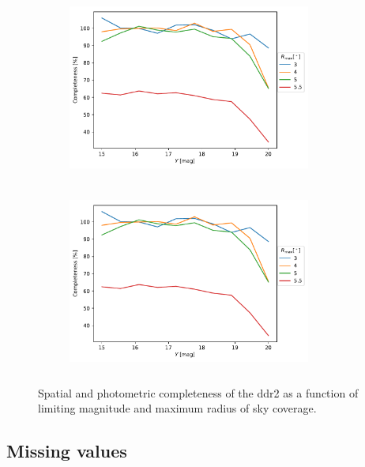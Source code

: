 \begin{figure}[ht!]
\begin{center}
     \begin{subfigure}[t]{0.49\textwidth}
      \includegraphics[page=4,height=6cm,width=8cm]{background/Figures/PhotoSpatialCompleteness_PDDR2.pdf}
    \end{subfigure}
    \begin{subfigure}[t]{0.49\textwidth}
      \includegraphics[page=5,height=6cm,width=8cm]{background/Figures/PhotoSpatialCompleteness_PDDR2.pdf}
    \end{subfigure}
\end{center}    
\caption{Spatial and photometric completeness of the \gls{ddr2} as a function of limiting magnitude and maximum radius of sky coverage.}
\label{fig:sptph_completeness}
\end{figure}


\subsection{Missing values}
\label{sect:ddr2_missing}

